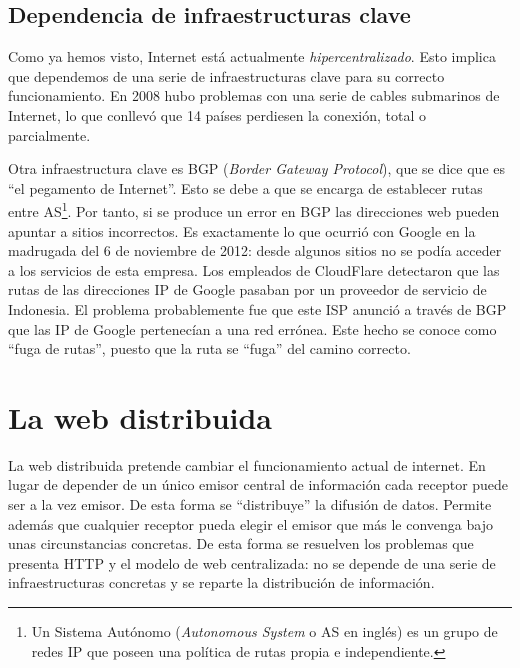 \documentclass[12pt]{article} %
\begin{document}

\subsection{Dependencia de infraestructuras clave} %
\label{sub:dependencia}

Como ya hemos visto, Internet está actualmente \textit{hipercentralizado}. Esto implica que dependemos de una serie de infraestructuras clave para su correcto funcionamiento. En 2008 hubo problemas con una serie de cables submarinos de Internet, lo que conllevó que 14 países perdiesen la conexión, total o parcialmente\cite{2008-cable-disruption}.

Otra infraestructura clave es BGP (\textit{Border Gateway Protocol}), que se dice que es ``el pegamento de Internet''. Esto se debe a que se encarga de establecer rutas entre AS\footnote{Un Sistema Autónomo (\textit{Autonomous System} o AS en inglés) es un grupo de redes IP que poseen una política de rutas propia e independiente.}. Por tanto, si se produce un error en BGP las direcciones web pueden apuntar a sitios incorrectos. Es exactamente lo que ocurrió con Google en la madrugada del 6 de noviembre de 2012: desde algunos sitios no se podía acceder a los servicios de esta empresa. Los empleados de CloudFlare\cite{cloudflare-google-outage} detectaron que las rutas de las direcciones IP de Google pasaban por un proveedor de servicio de Indonesia. El problema probablemente fue que este ISP anunció a través de BGP que las IP de Google pertenecían a una red errónea. Este hecho se conoce como ``fuga de rutas'', puesto que la ruta se ``fuga'' del camino correcto.



\section{La web distribuida} %
\label{sec:la_web_distribuida}

La web distribuida pretende cambiar el funcionamiento actual de internet. En lugar de depender de un único emisor central de información cada receptor puede ser a la vez emisor. De esta forma se ``distribuye'' la difusión de datos. Permite además que cualquier receptor pueda elegir el emisor que más le convenga bajo unas circunstancias concretas. De esta forma se resuelven los problemas que presenta HTTP y el modelo de web centralizada: no se depende de una serie de infraestructuras concretas y se reparte la distribución de información.
\end{document}
